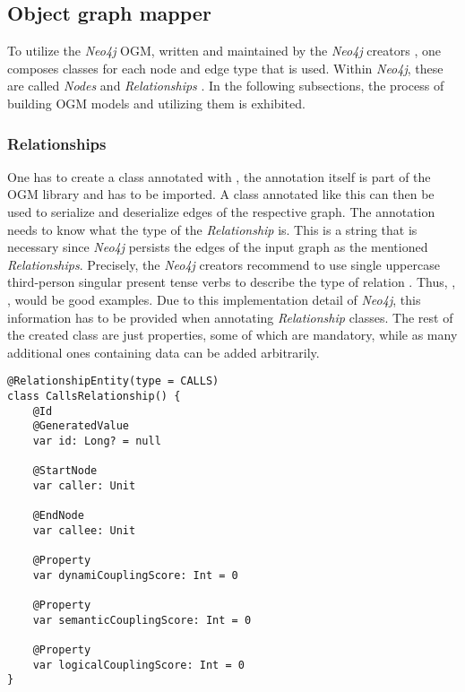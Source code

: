 \documentclass[12pt,a4paper]{report}
\begin{document}
\subsection{Object graph mapper}

To utilize the \textit{Neo4j} OGM, written and maintained by the \textit{Neo4j}
creators \cite{neo4j-ogm}, one composes classes for each node and edge type
that is used. Within \textit{Neo4j}, these are called \textit{Nodes} and
\textit{Relationships} \cite{neo4j-ogm}. In the following subsections, the
process of building OGM models and utilizing them is exhibited.

\subsubsection{Relationships} One has to create a class annotated with , the annotation itself is part of the OGM library and
has to be imported. A class annotated like this can then be used to serialize
and deserialize edges of the respective graph. The annotation needs to know
what the type of the \textit{Relationship} is. This is a string that is
necessary since \textit{Neo4j} persists the edges of the input graph as the
mentioned \textit{Relationships}. Precisely, the \textit{Neo4j} creators
recommend to use single uppercase third-person singular present tense verbs to
describe the type of relation \cite{neo4j-ogm}. Thus, , ,  would be good examples. Due to this implementation
detail of \textit{Neo4j}, this information has to be provided when annotating
\textit{Relationship} classes. The rest of the created class are just
properties, some of which are mandatory, while as many additional ones
containing data can be added arbitrarily.

\begin{lstlisting}[caption=Relationship OGM class, label=ogm-relationship, breaklines=true]
@RelationshipEntity(type = CALLS)
class CallsRelationship() {
    @Id
    @GeneratedValue
    var id: Long? = null

    @StartNode
    var caller: Unit

    @EndNode
    var callee: Unit

    @Property
    var dynamiCouplingScore: Int = 0

    @Property
    var semanticCouplingScore: Int = 0

    @Property
    var logicalCouplingScore: Int = 0
}
\end{lstlisting}
\end{document}
